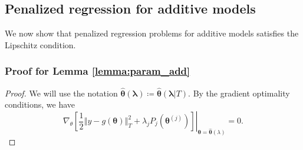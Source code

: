 \documentclass[10pt]{book}
\theoremstyle{definition}
\begin{document}
\subsection{Penalized regression for additive models}

We now show that penalized regression problems for additive models satisfies the Lipschitz condition.
\subsubsection{Proof for Lemma \ref{lemma:param_add}}
\begin{proof}
	We will use the notation $\hat{\boldsymbol{\theta}}(\boldsymbol{\lambda}) \coloneqq \hat{\boldsymbol{\theta}}(\boldsymbol{\lambda} | T)$. By the gradient optimality conditions, we have
	\begin{equation}
	\label{eq:grad_opt}
	\left.\nabla_{\theta} \left [
	\frac{1}{2}\left\Vert y-g(\boldsymbol{\theta})\right\Vert _{T}^{2}+\lambda_{j}P_{j}(\boldsymbol{\theta}^{(j)})
	\right ]
	\right|_{\boldsymbol{\theta}=\hat{\boldsymbol{\theta}}(\lambda)}=0.
	\end{equation}
	

\end{proof}
\end{document}
